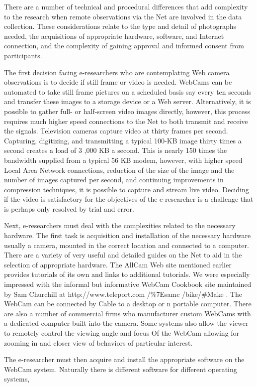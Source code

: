 \documentclass{book}
\begin{document}
There are a number of technical and procedural differences that add complexity to the research when remote observations via the Net are involved in the data collection. These considerations relate to the type and detail of photographs needed, the acquisitions of appropriate hardware, software, and Internet connection, and the complexity of gaining approval and informed consent from participants.\par 
The first decision facing e-researchers who are contemplating Web camera observations is to decide if still frame or video is needed. WebCams can be automated to take still frame pictures on a scheduled basis say every ten seconds and transfer these images to a storage device or a Web server. Alternatively, it is possible to gather full- or half-screen video images directly, however, this process requires much higher speed connections to the Net to both transmit and receive the signals. Television cameras capture video at thirty frames per second. Capturing, digitizing, and transmitting a typical 100-KB image thirty times a second creates a load of 3 ,000 KB a second. This is nearly 150 times the bandwidth supplied from a typical 56 KB modem, however, with higher speed Local Area Network connections, reduction of the size of the image and the number of images captured per second, and continuing improvements in compression techniques, it is possible to capture and stream live video. Deciding if the video is satisfactory for the objectives of the e-researcher is a challenge that is perhaps only resolved by trial and error.\par 
Next, e-researchers must deal with the complexities related to the necessary hardware. The first task is acquisition and installation of the necessary hardware usually a camera, mounted in the correct location and connected to a computer. There are a variety of very useful and detailed guides on the Net to aid in the selection of appropriate hardware. The AllCam Web site mentioned earlier provides tutorials of its own and links to additional tutorials. We were especially impressed with the informal but informative WebCam Cookbook site maintained by Sam Churchill at http://www.teleport.com /\%7Esamc /bike/#Make . The WebCam can be connected by Cable to a desktop or n portable computer. There are also a number of commercial firms who manufacturer custom WebCams with a dedicated computer built into the camera. Some systems also allow the viewer to remotely control the viewing angle and focus Of the WebCam allowing for zooming in and closer view of behaviors of particular interest.\par 
The e-researcher must then acquire and install the appropriate software on the WebCam system. Naturally there is different software for different operating systems,
\end{document}
